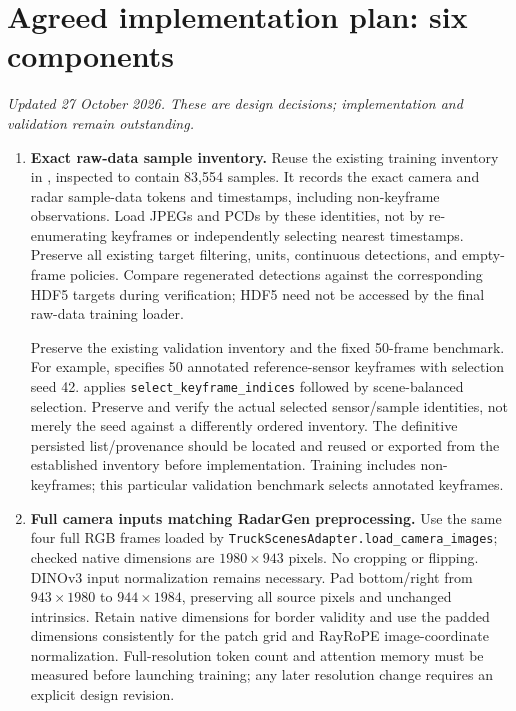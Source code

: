\documentclass[11pt,a4paper]{article}
\begin{document}
\section{Agreed implementation plan: six components}
\textit{Updated 27 October 2026. These are design decisions; implementation and validation remain outstanding.}
\begin{enumerate}
\item \textbf{Exact raw-data sample inventory.}
Reuse the existing training inventory in , inspected to contain 83,554 samples. It records the exact camera and radar sample-data tokens and timestamps, including non-keyframe observations. Load JPEGs and PCDs by these identities, not by re-enumerating keyframes or independently selecting nearest timestamps. Preserve all existing target filtering, units, continuous detections, and empty-frame policies. Compare regenerated detections against the corresponding HDF5 targets during verification; HDF5 need not be accessed by the final raw-data training loader.

Preserve the existing validation inventory and the fixed 50-frame benchmark. For example,  specifies 50 annotated reference-sensor keyframes with selection seed 42.  applies \texttt{select\_keyframe\_indices} followed by scene-balanced selection. Preserve and verify the actual selected sensor/sample identities, not merely the seed against a differently ordered inventory. The definitive persisted list/provenance should be located and reused or exported from the established inventory before implementation. Training includes non-keyframes; this particular validation benchmark selects annotated keyframes.

\item \textbf{Full camera inputs matching RadarGen preprocessing.}
Use the same four full RGB frames loaded by \texttt{TruckScenesAdapter.load\_camera\_images}; checked native dimensions are $1980\times943$ pixels. No cropping or flipping. DINOv3 input normalization remains necessary. Pad bottom/right from $943\times1980$ to $944\times1984$, preserving all source pixels and unchanged intrinsics. Retain native dimensions for border validity and use the padded dimensions consistently for the patch grid and RayRoPE image-coordinate normalization. Full-resolution token count and attention memory must be measured before launching training; any later resolution change requires an explicit design revision.


\end{enumerate}
\end{document}
